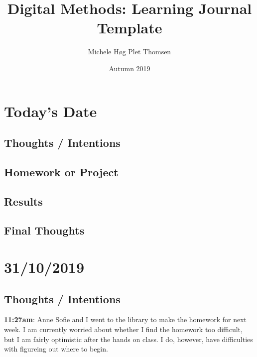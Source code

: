 \documentclass{article}
\title{Digital Methods: Learning Journal Template}
\author{Michele Høg Plet Thomsen}
\date{Autumn 2019}
\begin{document}
\maketitle

\section{Today's Date}
\subsection{Thoughts / Intentions}
\subsection{Homework or Project}
\subsection{Results}
\subsection{Final Thoughts}

\pagebreak{}

\section{31/10/2019}
\subsection{Thoughts / Intentions}

\textbf{11:27am}: Anne Sofie and I went to the library to make the homework for next week. I am currently worried about whether I find the homework too difficult, but I am fairly optimistic after the hands on class. I do, however, have difficulties with figureing out where to begin. 
\end{document}
